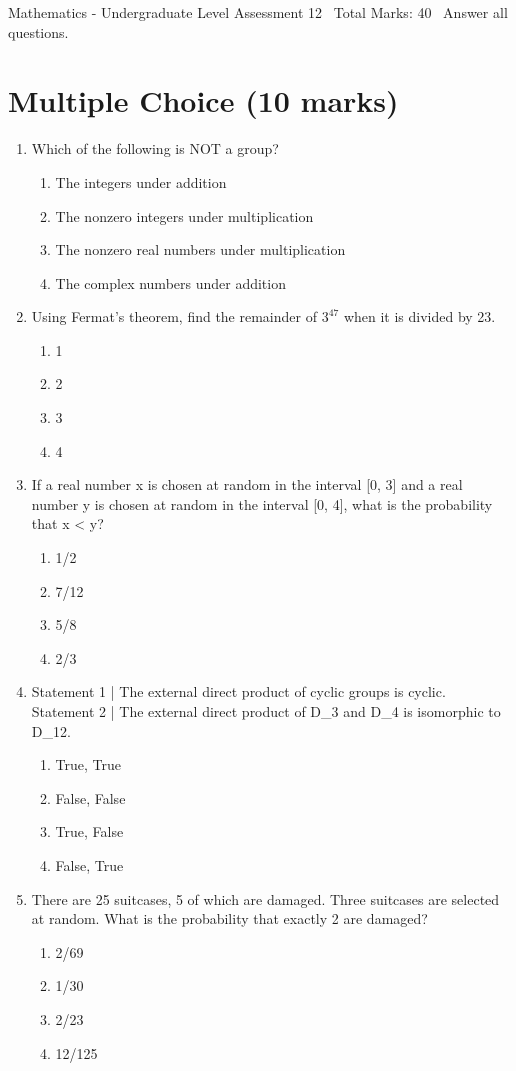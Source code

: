 \documentclass[12pt]{article}
\begin{document}
\begin{center}
Mathematics - Undergraduate Level Assessment 12 \
Total Marks: 40 \
Answer all questions.
\end{center}

\section*{Multiple Choice (10 marks)}
\begin{enumerate}[label=\arabic*.]
\item Which of the following is NOT a group?
\begin{enumerate}[label=(\alph*)]
    \item The integers under addition
    \item The nonzero integers under multiplication
    \item The nonzero real numbers under multiplication
    \item The complex numbers under addition
\end{enumerate}
\item Using Fermat's theorem, find the remainder of $3^47$ when it is divided by 23.
\begin{enumerate}[label=(\alph*)]
    \item 1
    \item 2
    \item 3
    \item 4
\end{enumerate}
\item If a real number x is chosen at random in the interval [0, 3] and a real number y is chosen at random in the interval [0, 4], what is the probability that x \textless{} y?
\begin{enumerate}[label=(\alph*)]
    \item 1/2
    \item 7/12
    \item 5/8
    \item 2/3
\end{enumerate}
\item Statement 1 | The external direct product of cyclic groups is cyclic. Statement 2 | The external direct product of D\_3 and D\_4 is isomorphic to D\_12.
\begin{enumerate}[label=(\alph*)]
    \item True, True
    \item False, False
    \item True, False
    \item False, True
\end{enumerate}
\item There are 25 suitcases, 5 of which are damaged. Three suitcases are selected at random. What is the probability that exactly 2 are damaged?
\begin{enumerate}[label=(\alph*)]
    \item 2/69
    \item 1/30
    \item 2/23
    \item 12/125
\end{enumerate}
\end{enumerate}
\end{document}
